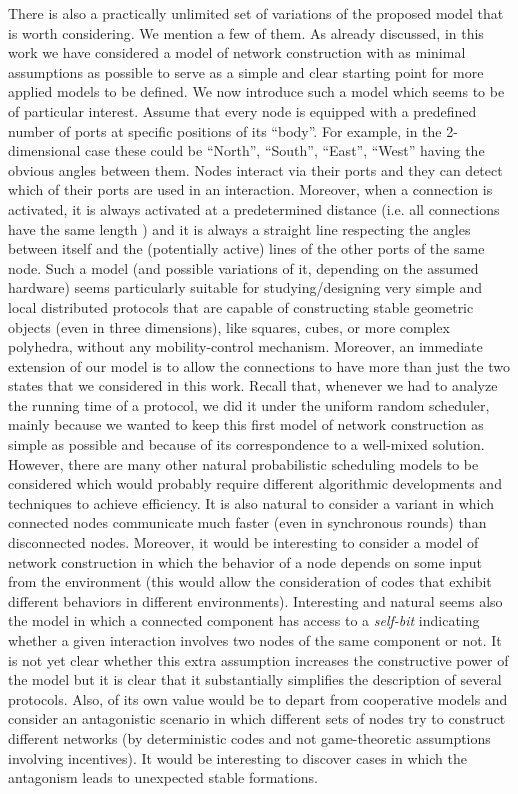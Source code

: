 \documentclass[oribibl, 11pt]{llncs}
\begin{document}
There is also a practically unlimited set of variations of the proposed model that is worth considering. We mention a few of them. As already discussed, in this work we have considered a model of network construction with as minimal assumptions as possible to serve as a simple and clear starting point for more applied models to be defined. We now introduce such a model which seems to be of particular interest. Assume that every node is equipped with a predefined number of ports at specific positions of its ``body''. For example, in the 2-dimensional case these could be ``North'', ``South'', ``East'', ``West'' having the obvious angles between them. Nodes interact via their ports and they can detect which of their ports are used in an interaction. Moreover, when a connection is activated, it is always activated at a predetermined distance (i.e. all connections have the same length ) and it is always a straight line respecting the angles between itself and the (potentially active) lines of the other ports of the same node. Such a model (and possible variations of it, depending on the assumed hardware) seems particularly suitable for studying/designing very simple and local distributed protocols that are capable of constructing stable geometric objects (even in three dimensions), like squares, cubes, or more complex polyhedra, without any mobility-control mechanism. Moreover, an immediate extension of our model is to allow the connections to have more than just the two states that we considered in this work. Recall that, whenever we had to analyze the running time of a protocol, we did it under the uniform random scheduler, mainly because we wanted to keep this first model of network construction as simple as possible and because of its correspondence to a well-mixed solution. However, there are many other natural probabilistic scheduling models to be considered which would probably require different algorithmic developments and techniques to achieve efficiency. It is also natural to consider a variant in which connected nodes communicate much faster (even in synchronous rounds) than disconnected nodes. Moreover, it would be interesting to consider a model of network construction in which the behavior of a node depends on some input from the environment (this would allow the consideration of codes that exhibit different behaviors in different environments). Interesting and natural seems also the model in which a connected component has access to a \emph{self-bit} indicating whether a given interaction involves two nodes of the same component or not. It is not yet clear whether this extra assumption increases the constructive power of the model but it is clear that it substantially simplifies the description of several protocols. Also, of its own value would be to depart from cooperative models and consider an antagonistic scenario in which different sets of nodes try to construct different networks (by deterministic codes and not game-theoretic assumptions involving incentives). It would be interesting to discover cases in which the antagonism leads to unexpected stable formations. 
\end{document}
